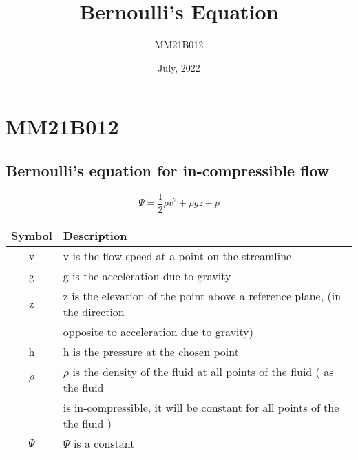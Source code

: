 \section{MM21B012}

\title{Bernoulli's Equation}
\author{MM21B012}
\date{July, 2022}

\maketitle				

\subsection{Bernoulli's equation for in-compressible flow}

\begin{equation} 
\Psi = \frac{1}{2} \rho v^2 + \rho gz + p
\end{equation}

\begin{tabular}{|c|l|}
\hline
    Symbol & Description \\
\hline
    v & v is the flow speed at a point on the streamline \\
\hline
    g & g is the acceleration due to gravity \\
\hline
    z & z is the elevation of the point above a reference plane, (in the direction \\
    & opposite to acceleration due to gravity) \\
 \hline
    h & h is the pressure at the chosen point \\
\hline 
    $ \rho $ & $ \rho $  is the density of the fluid at all points of the fluid ( as the fluid \\
    & is in-compressible, it will be constant for all points of the the fluid ) \\
\hline
    $ \Psi $ & $ \Psi $ is a constant \\
\hline
\end{tabular}


